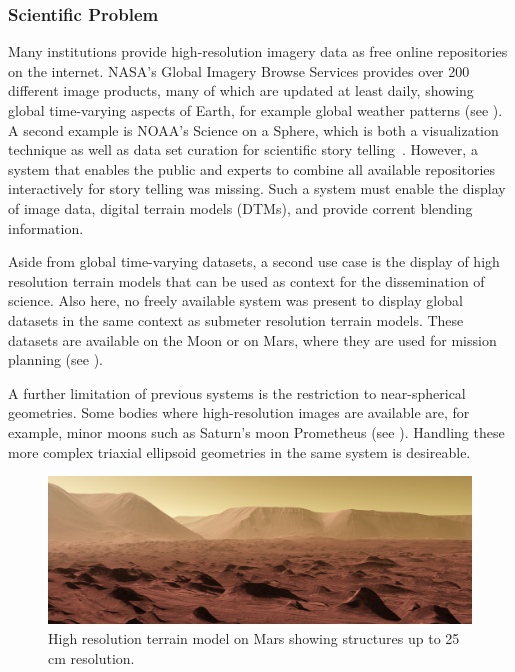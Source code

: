 \subsubsection{Scientific Problem} \label{contributions:astro:gb:problem}
Many institutions provide high-resolution imagery data as free online repositories on the internet.  NASA's Global Imagery Browse Services provides over 200 different image products, many of which are updated at least daily, showing global time-varying aspects of Earth, for example global weather patterns (see ).  A second example is NOAA's Science on a Sphere, which is both a visualization technique as well as data set curation for scientific story telling~\cite{ma2012scientific}.  However, a system that enables the public and experts to combine all available repositories interactively for story telling was missing.  Such a system must enable the display of image data, digital terrain models (DTMs), and provide corrent blending information.

Aside from global time-varying datasets, a second use case is the display of high resolution terrain models that can be used as context for the dissemination of science.  Also here, no freely available system was present to display global datasets in the same context as submeter resolution terrain models.  These datasets are available on the Moon or on Mars, where they are used for mission planning (see ).

A further limitation of previous systems is the restriction to near-spherical geometries.  Some bodies where high-resolution images are available are, for example, minor moons such as Saturn's moon Prometheus (see ).  Handling these more complex triaxial ellipsoid geometries in the same system is desireable.

\begin{figure}
\centering
\includegraphics[width=\abfboximagewidth]{figures/contributions/gb/mars.png}
\caption{High resolution terrain model on Mars showing structures up to 25\,cm resolution.}
\label{contributions:astro:gb:mars}
\end{figure}


